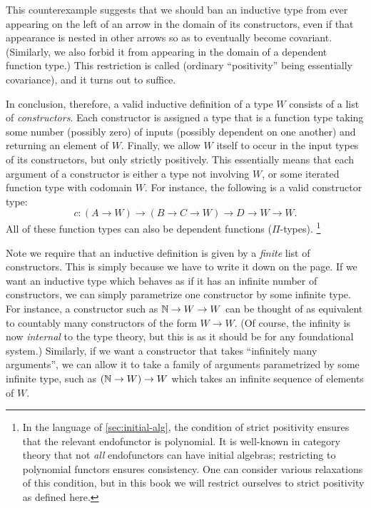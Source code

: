 %
This counterexample suggests that we should ban an inductive type from ever appearing on the left of an arrow in the domain of its constructors, even if that appearance is nested in other arrows so as to eventually become covariant.
(Similarly, we also forbid it from appearing in the domain of a dependent function type.)
This restriction is called 
%
%
(ordinary ``positivity'' being essentially covariance), and it turns out to suffice.

%
In conclusion, therefore, a valid inductive definition of a type $W$ consists of a list of \emph{constructors}.
Each constructor is assigned a type that is a function type taking some number (possibly zero) of inputs (possibly dependent on one another) and returning an element of $W$.
Finally, we allow $W$ itself to occur in the input types of its constructors, but only strictly positively.
This essentially means that each argument of a constructor is either a type not involving $W$, or some iterated function type with codomain $W$.
For instance, the following is a valid constructor type:
\begin{equation}
  c:(A\to W) \to (B\to C \to W) \to D \to W \to W.\label{eq:example-constructor}
\end{equation}
All of these function types can also be dependent functions ($\Pi$-types).%
\footnote{In the language of \autoref{sec:initial-alg}, the condition of strict positivity ensures that the relevant endofunctor is polynomial. It is well-known in category theory that not \emph{all} endofunctors can have initial algebras; restricting to polynomial functors ensures consistency.
One can consider various relaxations of this condition, but in this book we will restrict ourselves to strict positivity as defined here.}

Note we require that an inductive definition is given by a \emph{finite} list of constructors.
This is simply because we have to write it down on the page.
If we want an inductive type which behaves as if it has an infinite number of constructors, we can simply parametrize one constructor by some infinite type.
For instance, a constructor such as $\mathbb{N} \to W \to W$ can be thought of as equivalent to countably many constructors of the form $W\to W$.
(Of course, the infinity is now \emph{internal} to the type theory, but this is as it should be for any foundational system.)
Similarly, if we want a constructor that takes ``infinitely many arguments'', we can allow it to take a family of arguments parametrized by some infinite type, such as $(\mathbb{N}\to W) \to W$ which takes an infinite sequence of elements of $W$.

